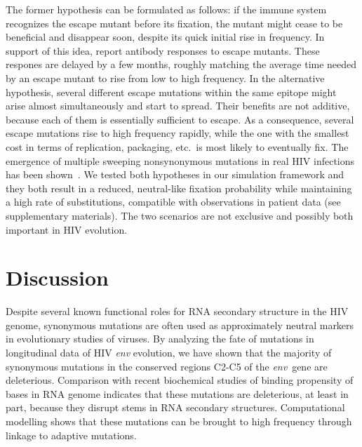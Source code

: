 \documentclass[rmp, twocolumn]{revtex4}
\newcommand{\env}{\textit{env}}
\begin{document}
The former hypothesis can be formulated as follows: if the immune system
recognizes the escape mutant before its fixation, the mutant might cease to be
beneficial and disappear soon, despite its quick initial rise in frequency. In support of this idea,
\citet{richman_rapid_2003, bunnik_autologous_2008} report antibody responses to
escape mutants. These respones are delayed by a few months, roughly matching the
average time needed by an escape mutant to rise from low to high frequency.
In the alternative hypothesis, several different escape
mutations within the same epitope might arise almost simultaneously and start to
spread. Their benefits are not additive, because each of them is
essentially sufficient to escape. As a consequence, several escape mutations rise to
high frequency rapidly, while the one with the smallest cost in terms of replication,
packaging, etc.~is most likely to eventually fix. The emergence of
multiple sweeping nonsynonymous mutations in real HIV infections has been 
shown~\citep{moore_limited_2009, bar_early_2012}.
We tested both hypotheses in our simulation framework and they both result
in a reduced, neutral-like fixation probability while maintaining a high
rate of substitutions, compatible with observations in patient data (see
supplementary materials).
The two scenarios are not exclusive and possibly both important in HIV
evolution.

\section{Discussion}
Despite several known functional roles for RNA secondary structure in the HIV
genome, synonymous mutations are often used as approximately neutral markers in
evolutionary studies of viruses. By analyzing the fate of mutations in
longitudinal data of HIV \env{} evolution, we have shown that the majority of
synonymous mutations in the conserved regions C2-C5 of the \env~gene are deleterious.
Comparison with recent biochemical studies of binding propensity of bases in RNA
genome indicates that these mutations are deleterious, at least in part, because
they disrupt stems in RNA secondary structures. Computational modelling
shows that these mutations can be brought to high frequency through
linkage to adaptive mutations.
\end{document}
